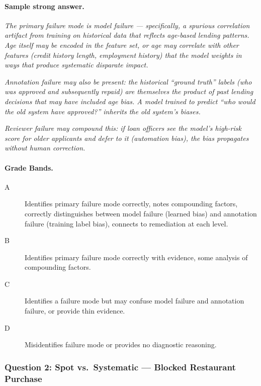 \paragraph{Sample strong answer.}

\emph{The primary failure mode is model failure --- specifically, a spurious correlation artifact from training on historical data that reflects age-based lending patterns. Age itself may be encoded in the feature set, or age may correlate with other features (credit history length, employment history) that the model weights in ways that produce systematic disparate impact.}

\emph{Annotation failure may also be present: the historical ``ground truth'' labels (who was approved and subsequently repaid) are themselves the product of past lending decisions that may have included age bias. A model trained to predict ``who would the old system have approved?'' inherits the old system's biases.}

\emph{Reviewer failure may compound this: if loan officers see the model's high-risk score for older applicants and defer to it (automation bias), the bias propagates without human correction.}

\paragraph{Grade Bands.}

\begin{description}
    \item[A] Identifies primary failure mode correctly, notes compounding factors, correctly distinguishes between model failure (learned bias) and annotation failure (training label bias), connects to remediation at each level.
    \item[B] Identifies primary failure mode correctly with evidence, some analysis of compounding factors.
    \item[C] Identifies a failure mode but may confuse model failure and annotation failure, or provide thin evidence.
    \item[D] Misidentifies failure mode or provides no diagnostic reasoning.
\end{description}

\subsubsection{Question 2: Spot vs.\ Systematic --- Blocked Restaurant Purchase}

